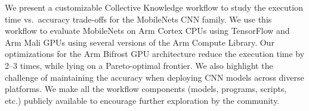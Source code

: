 We present a customizable Collective Knowledge workflow to study the execution
time vs.\ accuracy trade-offs for the MobileNets CNN family.
%
We use this workflow to evaluate MobileNets on Arm Cortex CPUs using TensorFlow
and Arm Mali GPUs using several versions of the Arm Compute Library.
%
Our optimizations for the Arm Bifrost GPU architecture reduce the execution
time by 2--3 times, while lying on a Pareto-optimal frontier.
%
We also highlight the challenge of maintaining the accuracy when deploying CNN
models across diverse platforms.
%
We make all the workflow components (models, programs, scripts, etc.) publicly
available to encourage further exploration by the community.
